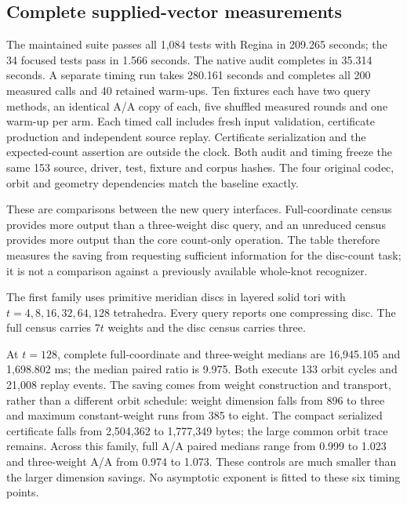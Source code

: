 \subsection{Complete supplied-vector measurements}

The maintained suite passes all 1,084 tests with Regina in 209.265 seconds;
the 34 focused tests pass in 1.566 seconds. The native audit completes in
35.314 seconds. A separate timing run takes 280.161 seconds and completes
all 200 measured calls and 40 retained warm-ups. Ten fixtures each have two
query methods, an identical A/A copy of each, five shuffled measured rounds
and one warm-up per arm. Each timed call includes fresh input validation,
certificate production and independent source replay. Certificate serialization
and the expected-count assertion are outside the clock. Both audit and timing
freeze the same 153 source, driver, test, fixture and corpus hashes. The four
original codec, orbit and geometry dependencies match the baseline exactly.

These are comparisons between the new query interfaces. Full-coordinate
census provides more output than a three-weight disc query, and an unreduced
census provides more output than the core count-only operation. The table
therefore measures the saving from requesting sufficient information for the
disc-count task; it is not a comparison against a previously available
whole-knot recognizer.

The first family uses primitive meridian discs in layered solid tori with
$t=4,8,16,32,64,128$ tetrahedra. Every query reports one compressing disc.
The full census carries $7t$ weights and the disc census carries three.



At $t=128$, complete full-coordinate and three-weight medians are
16,945.105 and 1,698.802 ms; the median paired ratio is 9.975. Both execute
133 orbit cycles and 21,008 replay events. The saving comes from weight
construction and transport, rather than a different orbit schedule: weight
dimension falls from 896 to three and maximum constant-weight runs from
385 to eight. The compact serialized certificate falls from 2,504,362 to
1,777,349 bytes; the large common orbit trace remains. Across this family,
full A/A paired medians range from 0.999 to 1.023 and three-weight A/A from
0.974 to 1.073. These controls are much smaller than the larger dimension
savings. No asymptotic exponent is fitted to these six timing points.

